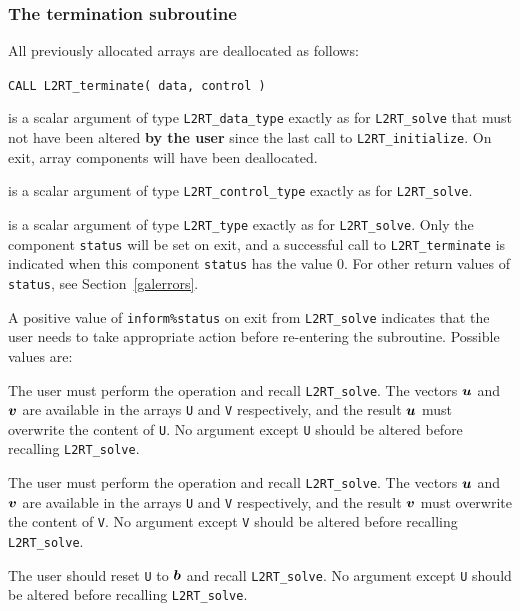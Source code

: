 \documentclass{galahad}
\newcommand{\packagename}{L2\-RT}
\begin{document}

\subsubsection{The  termination subroutine}
All previously allocated arrays are deallocated as follows:

\hskip0.5in
{\tt CALL \packagename\_terminate( data, control )}

\begin{description}

 is a scalar \intentinout argument of type
{\tt \packagename\_data\_type}
exactly as for
{\tt \packagename\_solve}
that must not have been altered {\bf by the user} since the last call to
{\tt \packagename\_initialize}.
On exit, array components will have been deallocated.

 is a scalar \intentin argument of type
{\tt \packagename\_control\_type}
exactly as for
{\tt \packagename\_solve}.

 is a scalar \intentout argument of type {\tt \packagename\_type}
exactly as for
{\tt \packagename\_solve}.
Only the component {\tt status} will be set on exit, and a
successful call to
{\tt \packagename\_terminate}
is indicated when this  component {\tt status} has the value 0.
For other return values of {\tt status}, see Section~\ref{galerrors}.

\end{description}


\galreverse
A positive value of {\tt inform\%status} on exit from
{\tt \packagename\_solve} indicates that the user needs to take appropriate
action before re-entering the subroutine. Possible values are:

\begin{description}

 The user must perform the operation
\disp{\bmu := \bmu + \bmA \bmv,}
and recall {\tt \packagename\_solve}.
The vectors ${\bm{u}}$ and ${\bm{v}}$ are available in the arrays {\tt U}
and {\tt V} respectively, and the result
${\bm{u}}$ must overwrite the content of {\tt U}.
No argument except {\tt U} should be altered before recalling
{\tt \packagename\_solve}.

 The user must perform the operation
and recall {\tt \packagename\_solve}.
The vectors ${\bm{u}}$ and ${\bm{v}}$ are available in the arrays {\tt U}
and {\tt V} respectively, and the result
${\bm{v}}$ must overwrite the content of {\tt V}.
No argument except {\tt V} should be altered before recalling
{\tt \packagename\_solve}.

  The user should reset {\tt U} to ${\bm{b}}$ and recall
{\tt \packagename\_solve}.
No argument except {\tt U} should be altered before recalling
{\tt \packagename\_solve}.
\end{description}
\end{document}
